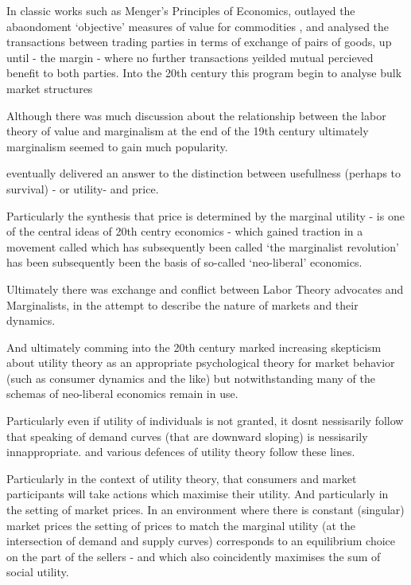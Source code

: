 In classic works such as Menger's Principles of Economics, outlayed the abaondoment `objective' measures of value for commodities \cite[Chapter 4]{mengerprinciples}, and analysed the transactions between trading parties in terms of exchange of pairs of goods, up until - the margin - where no further transactions yeilded mutual percieved benefit to both parties.\cite[Chapter 4]{mengerprinciples}
Into the 20th century this program begin to analyse bulk market structures


Although there was much discussion about the relationship between the labor theory of value and marginalism at the end of the 19th century \cite{steedman2003socialism} ultimately marginalism seemed to gain much popularity. 


eventually delivered an answer to the distinction between usefullness (perhaps to survival) - or utility- and price.

Particularly the synthesis that price is determined by the marginal utility - is one of the central ideas of 20th centry economics - which gained traction in a movement called which has subsequently been called `the marginalist revolution' has been subsequently been the basis of so-called `neo-liberal' economics.

Ultimately there was exchange and conflict between Labor Theory advocates and Marginalists, in the attempt to describe the nature of markets and their dynamics.

And ultimately comming into the 20th century marked increasing skepticism about utility theory as an appropriate psychological theory for market behavior (such as consumer dynamics and the like) but notwithstanding many of the schemas of neo-liberal economics remain in use.

Particularly even if utility of individuals is not granted, it dosnt nessisarily follow that speaking of demand curves (that are downward sloping) is nessisarily innappropriate. and various defences of utility theory follow these lines.

Particularly in the context of utility theory, that consumers and market participants will take actions which maximise their utility.
And particularly in the setting of market prices.
In an environment where there is constant (singular) market prices the setting of prices to match the marginal utility (at the intersection of demand and supply curves) corresponds to an equilibrium choice on the part of the sellers - and which also coincidently maximises the sum of social utility.






